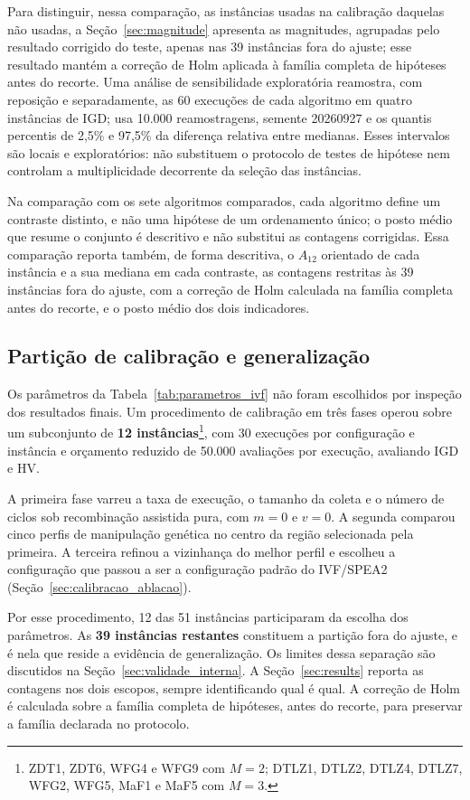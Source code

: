 Para distinguir, nessa comparação, as instâncias usadas na calibração daquelas não usadas, a Seção~\ref{sec:magnitude} apresenta as magnitudes, agrupadas pelo resultado corrigido do teste, apenas nas 39 instâncias fora do ajuste; esse resultado mantém a correção de Holm aplicada à família completa de hipóteses antes do recorte. Uma análise de sensibilidade exploratória reamostra, com reposição e separadamente, as 60 execuções de cada algoritmo em quatro instâncias de IGD; usa 10.000 reamostragens, semente 20260927 e os quantis percentis de 2,5\% e 97,5\% da diferença relativa entre medianas. Esses intervalos são locais e exploratórios: não substituem o protocolo de testes de hipótese nem controlam a multiplicidade decorrente da seleção das instâncias.

Na comparação com os sete algoritmos comparados, cada algoritmo define um contraste distinto, e não uma hipótese de um ordenamento único; o posto médio que resume o conjunto é descritivo e não substitui as contagens corrigidas. Essa comparação reporta também, de forma descritiva, o $A_{12}$ orientado de cada instância e a sua mediana em cada contraste, as contagens restritas às 39 instâncias fora do ajuste, com a correção de Holm calculada na família completa antes do recorte, e o posto médio dos dois indicadores.

\subsection{Partição de calibração e generalização}
\label{sec:calibracao}

Os parâmetros da Tabela~\ref{tab:parametros_ivf} não foram escolhidos por inspeção dos resultados finais. Um procedimento de calibração em três fases operou sobre um subconjunto de \textbf{12 instâncias}\footnote{ZDT1, ZDT6, WFG4 e WFG9 com $M = 2$; DTLZ1, DTLZ2, DTLZ4, DTLZ7, WFG2, WFG5, MaF1 e MaF5 com $M = 3$.}, com 30 execuções por configuração e instância e orçamento reduzido de 50.000 avaliações por execução, avaliando IGD e HV.

A primeira fase varreu a taxa de execução, o tamanho da coleta e o número de ciclos sob recombinação assistida pura, com $m = 0$ e $v = 0$. A segunda comparou cinco perfis de manipulação genética no centro da região selecionada pela primeira. A terceira refinou a vizinhança do melhor perfil e escolheu a configuração que passou a ser a configuração padrão do IVF/SPEA2 (Seção~\ref{sec:calibracao_ablacao}).

Por esse procedimento, 12 das 51 instâncias participaram da escolha dos parâmetros. As \textbf{39 instâncias restantes} constituem a partição fora do ajuste, e é nela que reside a evidência de generalização. Os limites dessa separação são discutidos na Seção~\ref{sec:validade_interna}. A Seção~\ref{sec:results} reporta as contagens nos dois escopos, sempre identificando qual é qual. A correção de Holm é calculada sobre a família completa de hipóteses, antes do recorte, para preservar a família declarada no protocolo.

